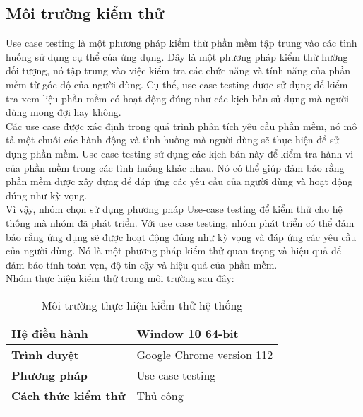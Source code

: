\subsection{Môi trường kiểm thử}

Use case testing là một phương pháp kiểm thử phần mềm tập trung vào các tình huống sử dụng cụ thể của ứng dụng. Đây là một phương pháp kiểm thử hướng đối tượng, nó tập trung vào việc kiểm tra các chức năng và tính năng của phần mềm từ góc độ của người dùng. Cụ thể, use case testing được sử dụng để kiểm tra xem liệu phần mềm có hoạt động đúng như các kịch bản sử dụng mà người dùng mong đợi hay không.\\

Các use case được xác định trong quá trình phân tích yêu cầu phần mềm, nó mô tả một chuỗi các hành động và tình huống mà người dùng sẽ thực hiện để sử dụng phần mềm. Use case testing sử dụng các kịch bản này để kiểm tra hành vi của phần mềm trong các tình huống khác nhau. Nó có thể giúp đảm bảo rằng phần mềm được xây dựng để đáp ứng các yêu cầu của người dùng và hoạt động đúng như kỳ vọng.\\

Vì vậy, nhóm chọn sử dụng phương pháp Use-case testing để kiểm thử cho hệ thống mà nhóm đã phát triển. Với use case testing, nhóm phát triển có thể đảm bảo rằng ứng dụng sẽ được hoạt động đúng như kỳ vọng và đáp ứng các yêu cầu của người dùng. Nó là một phương pháp kiểm thử quan trọng và hiệu quả để đảm bảo tính toàn vẹn, độ tin cậy và hiệu quả của phần mềm.\\

\hspace*{0.5cm}Nhóm thực hiện kiểm thử trong môi trường sau đây:
\\
{
\setlength\extrarowheight{6pt}
\begin{longtable}{| p{} | p{} |}
    \hline
    \textbf{Hệ điều hành}       & Window 10 64-bit          \\
    \hline
    \textbf{Trình duyệt}        & Google Chrome version 112 \\
    \hline
    \textbf{Phương pháp}        & Use-case testing          \\
    \hline
    \textbf{Cách thức kiểm thử} & Thủ công                  \\
    \hline
    \caption{Môi trường thực hiện kiểm thử hệ thống}
\end{longtable}
}

